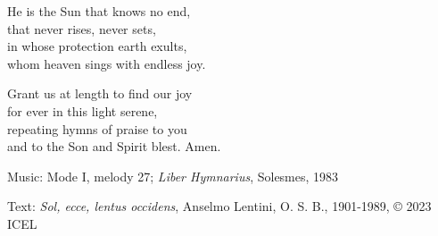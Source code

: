 \hymn



\begin{underhymnverse}
He is the Sun that knows no end,\\
that never rises, never sets,\\
in whose protection earth exults,\\
whom heaven sings with endless joy.

Grant us at length to find our joy\\
for ever in this light serene,\\
repeating hymns of praise to you\\
and to the Son and Spirit blest. Amen.
\end{underhymnverse}


\begin{hymnsource}
Music: Mode I, melody 27; \emph{Liber Hymnarius}, Solesmes, 1983

Text: \emph{Sol, ecce, lentus occidens}, Anselmo Lentini, O. S. B., 1901-1989, © 2023 ICEL
\end{hymnsource}
